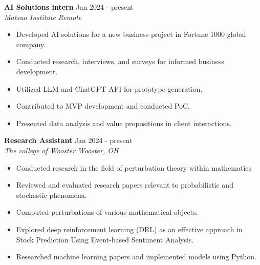 \documentclass[a4paper,12pt]{article}
\begin{document}
\textbf{\large AI Solutions intern} \hfill \textnormal{Jan 2024 - present}\\
\textit{Matsuo Institute} \hfill \textit{Remote}
\begin{itemize}
    \item Developed AI solutions for a new business project in Fortune 1000 global company.
    \item Conducted research, interviews, and surveys for informed business development.
    \item Utilized LLM and ChatGPT API for prototype generation.
    \item Contributed to MVP development and conducted PoC.
    \item Presented data analysis and value propositions in client interactions.
\end{itemize}
\textbf{\large Research Assistant} \hfill \textnormal{Jan 2024 - present}\\
\textit{The college of Wooster} \hfill \textit{Wooster, OH}
\begin{itemize}
    \item Conducted research in the field of perturbation theory within mathematics
    \item Reviewed and evaluated research papers relevant to probabilistic and stochastic phenomena.
    \item Computed perturbations of various mathematical objects.
    \item Explored deep reinforcement learning (DRL) as an effective approach in Stock Prediction Using Event-based Sentiment Analysis.
    \item Researched machine learning papers and implemented models using Python.
\end{itemize}
\end{document}
